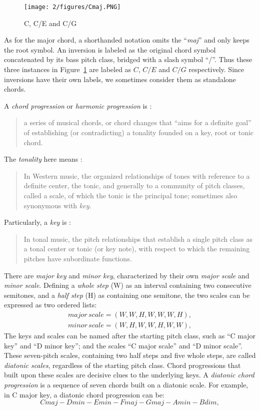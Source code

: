\begin{figure}[htb]
\centering
\texttt{[image: 2/figures/Cmaj.PNG]}
\caption{C, C/E and C/G}
\label{fig:2-cmaj}
\end{figure}
As for the major chord, a shorthanded notation omits the ``\textit{maj}'' and only keeps the root symbol. An inversion is labeled as the original chord symbol concatenated by its bass pitch class, bridged with a slash symbol ``/''. Thus these three instances in Figure~\ref{fig:2-cmaj} are labeled as $C$, $C/E$ and $C/G$ respectively. Since inversions have their own labels, we sometimes consider them as standalone chords.

A {\it chord progression} or {\it harmonic progression} is \cite{schonberg1989structural}:
\begin{quote}
a series of musical chords, or chord changes that ``aims for a definite goal'' of establishing (or contradicting) a tonality founded on a key, root or tonic chord.
\end{quote}
The {\it tonality} here means \cite{randel1999harvard}:
\begin{quote}
In Western music, the organized relationships of tones with reference to a definite center, the tonic, and generally to a community of pitch classes, called a scale, of which the tonic is the principal tone; sometimes also synonymous with {\it key}.
\end{quote}

Particularly, a {\it key} is \cite{randel1999harvard}:
\begin{quote}
In tonal music, the pitch relationships that establish a single pitch class as a tonal center or tonic (or key note), with respect to which the remaining pitches have subordinate functions.
\end{quote}
There are {\it major key} and {\it minor key}, characterized by their own {\it major scale} and {\it minor scale}. Defining a {\it whole step} (W) as an interval containing two consecutive semitones, and a {\it half step} (H) as containing one semitone, the two scales can be expressed as two ordered lists:
\begin{equation}
\begin{split}
\mathit{major\,scale=(W,W,H,W,W,W,H)},\\
\mathit{minor\,scale=(W,H,W,W,H,W,W)},
\end{split}
\end{equation}
The keys and scales can be named after the starting pitch class, such as ``C major key'' and ``D minor key''; and the scales ``C major scale'' and ``D minor scale''.  These seven-pitch scales, containing two half steps and five whole steps, are called {\it diatonic scales}, regardless of the starting pitch class. Chord progressions that built upon these scales are decisive clues to the underlying keys. A {\it diatonic chord progression} is a sequence of seven chords built on a diatonic scale. For example, in C major key, a diatonic chord progression can be:
\begin{equation}
\mathit{Cmaj - Dmin - Emin - Fmaj - Gmaj - Amin - Bdim,}
\end{equation}


